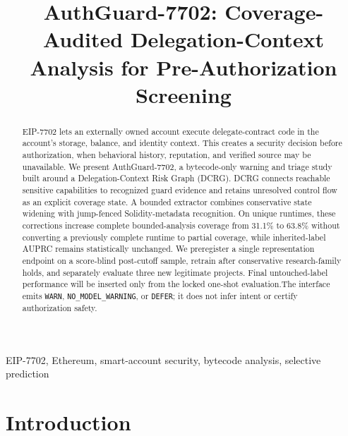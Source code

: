 \documentclass[conference]{IEEEtran}
\title{AuthGuard-7702: Coverage-Audited Delegation-Context Analysis for
Pre-Authorization Screening}
\author{\IEEEauthorblockN{Anonymous Authors}}
\newcommand{\code}[1]{\texttt{#1}}
\newcommand{\pending}[1]{\textcolor{red}{\textbf{[#1]}}}
\newif\ifresultsready
\newcommand{\FinalBinaryN}{\pending{N-BINARY}}
\newcommand{\PrimaryDelta}{\pending{FULL-MINUS-UNTYPED}}
\newcommand{\PrimaryLower}{\pending{PRIMARY-CI-LOWER}}
\newcommand{\PrimaryUpper}{\pending{PRIMARY-CI-UPPER}}
\newcommand{\FullAUPRC}{\pending{TBD}}
\begin{document}
\maketitle

\ifresultsready\else
\begin{center}
\end{center}
\fi

\begin{abstract}
EIP-7702 lets an externally owned account execute delegate-contract code in the account's
storage, balance, and identity context. This creates a security decision before authorization,
when behavioral history, reputation, and verified source may be unavailable. We present
AuthGuard-7702, a bytecode-only warning and triage study built around a Delegation-Context Risk
Graph (DCRG). DCRG connects reachable sensitive capabilities to recognized guard evidence and
retains unresolved control flow as an explicit coverage state. A bounded extractor combines
conservative state widening with jump-fenced Solidity-metadata recognition. On
\CanonicalRuntimes{} unique
runtimes, these corrections increase complete bounded-analysis coverage from 31.1\% to 63.8\%
without converting a previously complete runtime to partial coverage, while inherited-label
AUPRC remains statistically unchanged. We preregister a single representation endpoint on a
score-blind post-cutoff sample, retrain after conservative research-family holds, and separately
evaluate three new legitimate projects. \ifresultsready On \FinalBinaryN{} adjudicated binary
judgments, full DCRG reaches \FullAUPRC{} AUPRC and differs from its type-erased ablation by
\PrimaryDelta{} (95\% paired dependence-cluster interval [\PrimaryLower{}, \PrimaryUpper{}]).
\else Final untouched-label performance will be inserted only from the locked one-shot
evaluation.\fi The interface emits \code{WARN}, \code{NO\_MODEL\_WARNING}, or \code{DEFER}; it
does not infer intent or certify authorization safety.
\end{abstract}

\begin{IEEEkeywords}
EIP-7702, Ethereum, smart-account security, bytecode analysis, selective prediction
\end{IEEEkeywords}

\section{Introduction}
\end{document}
